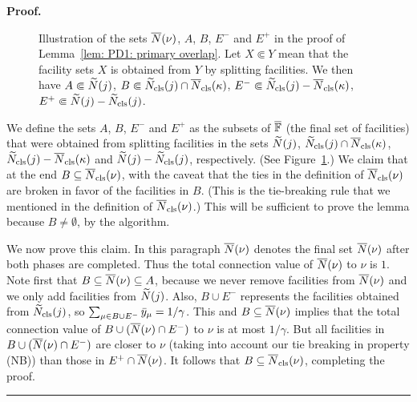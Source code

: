 \documentclass[oneside,final]{ucr}
\newenvironment{proof}[1][Proof]{\textbf{#1.} }{\ \rule{0.5em}{0.5em}}
\def\dsp{\def\baselinestretch{2.0}\large\normalsize}
\def\ssp{\def\baselinestretch{1.0}\large\normalsize}
\begin{document}
\begin{proof}
\begin{figure}[ht]
\begin{center}
\ssp
\caption[Illustration of the sets in the proof of
Lemma~\ref{lem: PD1: primary overlap}]{Illustration of the
  sets ${\overline{N}}(\nu)$, $A$, $B$, $E^-$ and $E^+$ in the proof
  of Lemma~\ref{lem: PD1: primary overlap}. Let $X \Subset
  Y$ mean that the facility sets $X$ is obtained from $Y$ by
  splitting facilities.  We then have $A \Subset
  {\widetilde N}(j)$, $B \Subset {\widetilde N}_{{\mbox{\scriptsize\rm cls}}}(j) \cap
  {\overline{N}}_{{\mbox{\scriptsize\rm cls}}}(\kappa)$, $E^- \Subset {\widetilde N}_{{\mbox{\scriptsize\rm cls}}}(j) -
  {\overline{N}}_{{\mbox{\scriptsize\rm cls}}}(\kappa)$, $E^+ \Subset {\widetilde N}(j) -
  {\widetilde N}_{{\mbox{\scriptsize\rm cls}}}(j)$.}
\dsp
\label{fig: sets lemma PD'3a}
\end{center}
\end{figure}
\dsp
  We define the sets $A$, $B$, $E^-$ and $E^+$ as the subsets of
  $\overline{\mathbb{F}}$ (the final set of facilities) that were obtained from
  splitting facilities in the sets ${\widetilde N}(j)$, ${\widetilde N}_{{\mbox{\scriptsize\rm cls}}}(j)\cap
  {\overline{N}}_{{\mbox{\scriptsize\rm cls}}}(\kappa)$, ${\widetilde N}_{{\mbox{\scriptsize\rm cls}}}(j) - {\overline{N}}_{{\mbox{\scriptsize\rm cls}}}(\kappa)$ and
  ${\widetilde N}(j) - {\widetilde N}_{{\mbox{\scriptsize\rm cls}}}(j)$, respectively.  (See
  Figure~\ref{fig: sets lemma PD'3a}.)  We claim that at the end
  $B\subseteq {\overline{N}}_{{\mbox{\scriptsize\rm cls}}}(\nu)$, with the caveat that the ties in the
  definition of ${\overline{N}}_{{\mbox{\scriptsize\rm cls}}}(\nu)$ are broken in favor of the
  facilities in $B$.  (This is the tie-breaking rule that we mentioned
  in the definition of ${\overline{N}}_{{\mbox{\scriptsize\rm cls}}}(\nu)$.)  This will be sufficient to
  prove the lemma because $B\neq\emptyset$, by the algorithm.

  We now prove this claim. In this paragraph ${\overline{N}}(\nu)$ denotes the
  final set ${\overline{N}}(\nu)$ after both phases are completed. Thus the total
connection value of ${\overline{N}}(\nu)$ to $\nu$ is $1$.
	Note first that
  $B\subseteq {\overline{N}}(\nu) \subseteq A$, because we never remove
  facilities from ${\overline{N}}(\nu)$ and we only add facilities from
  ${\widetilde N}(j)$.  Also, $B\cup E^-$ represents the facilities obtained
  from ${\widetilde N}_{{\mbox{\scriptsize\rm cls}}}(j)$, so $\sum_{\mu\in B\cup E^-} {\bar y}_{\mu} =
  1/\gamma$.  This and $B\subseteq {\overline{N}}(\nu)$ implies that the total
  connection value of $B\cup ({\overline{N}}(\nu)\cap E^-)$ to $\nu$ is at
  most $1/\gamma$. But all facilities in $B\cup ({\overline{N}}(\nu)\cap E^-)$
  are closer to $\nu$ (taking into account our tie breaking in property (NB))
 	than those in $E^+\cap {\overline{N}}(\nu)$. It follows
  that $B\subseteq {\overline{N}}_{{\mbox{\scriptsize\rm cls}}}(\nu)$, completing the proof.
\end{proof}
\end{document}
